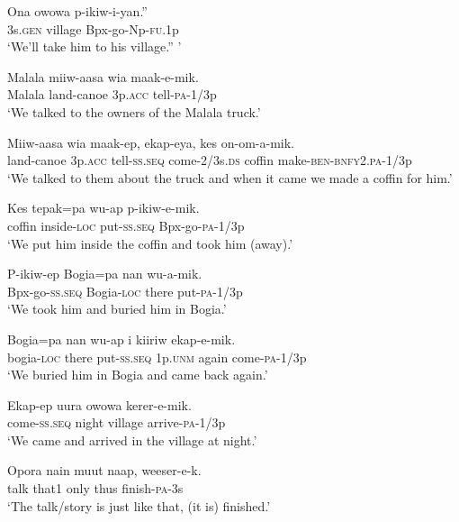 \ea
\gll  Ona  owowa  p-ikiw-i-yan.” \\
3s.\textsc{gen}  village  Bpx-go-Np-\textsc{fu}.1p \\
\glt ‘We’ll take him to his village.” ’ \\
\z


\ea
\gll  Malala  miiw-aasa  wia  maak-e-mik. \\
Malala  land-canoe  3p.\textsc{acc}  tell-\textsc{pa}-1/3p \\
\glt ‘We talked to the owners of the Malala truck.’ \\
\z


\ea
\gll  Miiw-aasa  wia  maak-ep,  ekap-eya,  kes          on-om-a-mik. \\
land-canoe  3p.\textsc{acc}  tell-\textsc{ss.seq}  come-2/3s.\textsc{ds}  coffin   make-\textsc{ben}-\textsc{bnfy}2.\textsc{pa}-1/3p \\


\glt ‘We talked to them about the truck and when it came we made a coffin for him.’ \\
\z


\ea
\gll  Kes  tepak=pa  wu-ap  p-ikiw-e-mik. \\
coffin  inside-\textsc{loc}  put-\textsc{ss.seq}  Bpx-go-\textsc{pa}-1/3p \\
\glt ‘We put him inside the coffin and took him (away).’ \\
\z


\ea
\gll  P-ikiw-ep  Bogia=pa  nan  wu-a-mik. \\
Bpx-go-\textsc{ss.seq}  Bogia-\textsc{loc}  there  put-\textsc{pa}-1/3p \\
\glt ‘We took him and buried him in Bogia.’ \\
\z


\ea
\gll  Bogia=pa  nan  wu-ap  i  kiiriw  ekap-e-mik. \\
bogia-\textsc{loc}  there  put-\textsc{ss.seq}  1p.\textsc{unm}  again  come-\textsc{pa}-1/3p \\
\glt ‘We buried him in Bogia and came back again.’ \\
\z


\ea
\gll  Ekap-ep  uura  owowa  kerer-e-mik. \\
come-\textsc{ss.seq}  night  village  arrive-\textsc{pa}-1/3p \\
\glt ‘We came and arrived in the village at night.’ \\
\z


\ea
\gll  Opora  nain  muut  naap,  weeser-e-k. \\
talk  that1  only  thus  finish-\textsc{pa}-3s \\
\glt ‘The talk/story is just like that, (it is) finished.’ \\
\z

